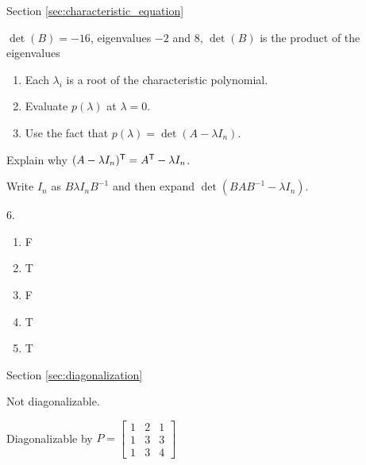 \begin{multicols}{2}
\begin{enumerate}[label=(\alph*), leftmargin=1\parindent]
\end{enumerate} 

\oee

\hspace{-0.25in} Section \ref{sec:characteristic_equation}

\obe
\item 
	\ba
	\item $\det(B) = -16$, eigenvalues $-2$ and $8$, $\det(B)$ is the product of the eigenvalues
	\item 
		\begin{enumerate}[label=\roman*.]
		\item Each $\lambda_i$ is a root of the characteristic polynomial. 
		\item Evaluate $p(\lambda)$ at $\lambda = 0$.
		\item Use the fact that $p(\lambda) = \det(A - \lambda I_n)$.
		\end{enumerate}
	
	\ea
	
	
\item Explain why $(A - \lambda I_n)^{\mathsf{T}} = A^{\mathsf{T}} - \lambda I_n$. 

\item Write $I_n$ as $B\lambda I_nB^{-1}$ and then expand $\det\left(BAB^{-1} - \lambda I_n \right)$.  

\oee

\be
\item[6.] 
\begin{enumerate}[label=(\alph*), leftmargin=1\parindent]
\item F
\item T
\item F
\item T
\item T
\end{enumerate}

\ee

\hspace{-0.25in} Section \ref{sec:diagonalization}

\obe
\item
\ba
\item Not diagonalizable.

\item Diagonalizable by $P = \left[ \begin{array}{ccc} 1&2&1\\1&3&3\\1&3&4 \end{array} \right]$ 


\end{multicols}
